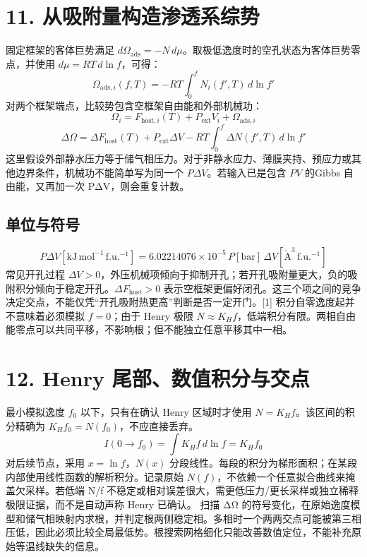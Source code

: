 \documentclass[UTF8,a4paper,11pt]{ctexart}
\begin{document}
\section*{11. 从吸附量构造渗透系综势}
固定框架的客体巨势满足 \(d\Omega_{\mathrm{ads}}=-N\,d\mu\)。取极低逸度时的空孔状态为客体巨势零点，并使用 \(d\mu=RT\,d\ln f\)，可得：
\begin{equation*}
\Omega_{\mathrm{ads},i}(f,T)=-RT\int_{0}^{f}N_i(f',T)\,d\ln f'
\end{equation*}
对两个框架端点，比较势包含空框架自由能和外部机械功：
\begin{equation*}
\Omega_i=F_{\mathrm{host},i}(T)+P_{\mathrm{ext}}V_i+\Omega_{\mathrm{ads},i}
\end{equation*}
\begin{equation*}
\Delta\Omega=\Delta F_{\mathrm{host}}(T)+P_{\mathrm{ext}}\Delta V-RT\int_{0}^{f}\Delta N(f',T)\,d\ln f'
\end{equation*}
这里假设外部静水压力等于储气相压力。对于非静水应力、薄膜夹持、预应力或其他边界条件，机械功不能简单写为同一个 \(P\Delta V\)。若输入已是包含 \(PV\) 的Gibbs 自由能，又再加一次 PΔV，则会重复计数。
\subsection*{单位与符号}
\begin{equation*}
P\Delta V[\mathrm{kJ\,mol^{-1}\,f.u.^{-1}}]=6.02214076\times10^{-5}\,P[\mathrm{bar}]\,\Delta V[\mathrm{\mathring A^3\,f.u.^{-1}}]
\end{equation*}
常见开孔过程 \(\Delta V>0\)，外压机械项倾向于抑制开孔；若开孔吸附量更大，负的吸附积分倾向于稳定开孔。\(\Delta F_{\mathrm{host}}>0\) 表示空框架更偏好闭孔。这三个项之间的竞争决定交点，不能仅凭“开孔吸附热更高”判断是否一定开门。[1]
积分自零逸度起并不意味着必须模拟 \(f=0\)；由于 Henry 极限 \(N\approx K_H f\)，低端积分有限。两相自由能零点可以共同平移，不影响根；但不能独立任意平移其中一相。
\clearpage
\section*{12. Henry 尾部、数值积分与交点}
最小模拟逸度 \(f_0\) 以下，只有在确认 Henry 区域时才使用 \(N=K_H f\)。该区间的积分精确为 \(K_H f_0=N(f_0)\)，不应直接丢弃。
\begin{equation*}
I(0\to f_0)=\int K_H f\,d\ln f=K_H f_0
\end{equation*}
对后续节点，采用 \(x=\ln f\)，\(N(x)\) 分段线性。每段的积分为梯形面积；在某段内部使用线性函数的解析积分。记录原始 \(N(f)\)，不依赖一个任意拟合曲线来掩盖欠采样。若低端 N/f 不稳定或相对误差很大，需更低压力/更长采样或独立稀释极限证据，而不是自动声称 Henry 已确认。
扫描 ΔΩ 的符号变化，在原始逸度模型和储气相映射内求根，并判定根两侧稳定相。多相时一个两两交点可能被第三相压低，因此必须比较全局最低势。根搜索网格细化只能改善数值定位，不能补充原始等温线缺失的信息。
\end{document}

